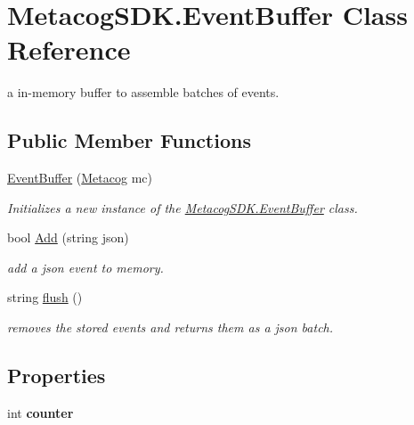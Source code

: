 \hypertarget{classMetacogSDK_1_1EventBuffer}{}\section{Metacog\+S\+D\+K.\+Event\+Buffer Class Reference}
\label{classMetacogSDK_1_1EventBuffer}


a in-\/memory buffer to assemble batches of events.  


\subsection*{Public Member Functions}
\begin{DoxyCompactItemize}
\item 
\hyperlink{classMetacogSDK_1_1EventBuffer_a26f471aeadaa2c65e72d9d5c5fca85fb}{Event\+Buffer} (\hyperlink{classMetacogSDK_1_1Metacog}{Metacog} mc)
\begin{DoxyCompactList}\small\item\em Initializes a new instance of the \hyperlink{classMetacogSDK_1_1EventBuffer}{Metacog\+S\+D\+K.\+Event\+Buffer} class. \end{DoxyCompactList}\item 
bool \hyperlink{classMetacogSDK_1_1EventBuffer_afc7f88e414442994bed411ddd5faaabe}{Add} (string json)
\begin{DoxyCompactList}\small\item\em add a json event to memory. \end{DoxyCompactList}\item 
string \hyperlink{classMetacogSDK_1_1EventBuffer_a0f949874b91790b01292d2acc2feec84}{flush} ()
\begin{DoxyCompactList}\small\item\em removes the stored events and returns them as a json batch. \end{DoxyCompactList}\end{DoxyCompactItemize}
\subsection*{Properties}
\begin{DoxyCompactItemize}
\item 
int {\bfseries counter}\hypertarget{classMetacogSDK_1_1EventBuffer_a5e138ae320239d55d901a693146273e9}{}\label{classMetacogSDK_1_1EventBuffer_a5e138ae320239d55d901a693146273e9}

\end{DoxyCompactItemize}


